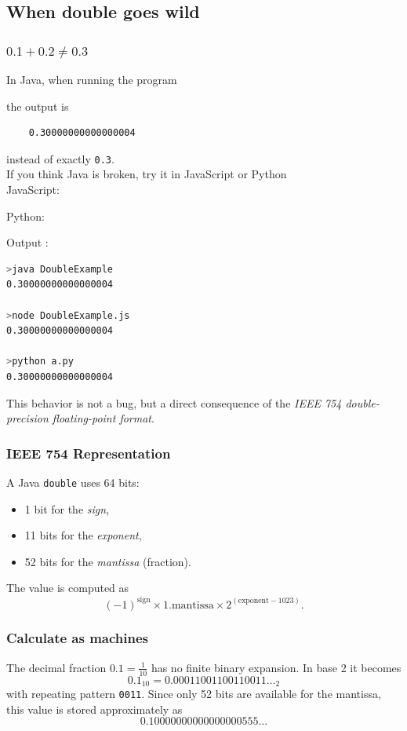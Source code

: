 \documentclass{article}
\begin{document}
\subsection{When double goes wild}
\subsubsection{$0.1 + 0.2 \ne 0.3$}
In Java, when running the program

the output is
\begin{verbatim}
	0.30000000000000004
\end{verbatim}
instead of exactly \texttt{0.3}. \\

If you think Java is broken, try it in JavaScript or Python\\
JavaScript:

Python:

Output :
\begin{lstlisting}[language=bash]
>java DoubleExample
0.30000000000000004

>node DoubleExample.js
0.30000000000000004

>python a.py
0.30000000000000004	
\end{lstlisting}

This behavior is not a bug, but a direct consequence of the \emph{IEEE 754 double-precision floating-point format}.

\subsubsection{IEEE 754 Representation}
A Java \texttt{double} uses 64 bits:
\begin{itemize}
	\item 1 bit for the \emph{sign},
	\item 11 bits for the \emph{exponent},
	\item 52 bits for the \emph{mantissa} (fraction).
\end{itemize}

The value is computed as
\[
(-1)^{\text{sign}} \times 1.\text{mantissa} \times 2^{(\text{exponent} - 1023)}.
\]

\subsubsection{Calculate as machines}
The decimal fraction $0.1 = \tfrac{1}{10}$ has no finite binary expansion.
In base 2 it becomes
\[
0.1_{10} = 0.00011001100110011\ldots_2
\]
with repeating pattern \texttt{0011}. Since only 52 bits are available for
the mantissa, this value is stored approximately as
\[
0.10000000000000000555\ldots
\]
\end{document}
